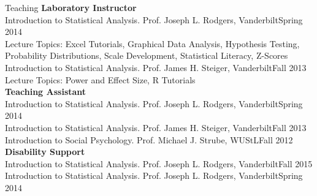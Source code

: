 \documentclass {resume}
\begin{document}
\begin{rSection}{\textrm{Teaching
}}
{\large {\bf Laboratory Instructor}\\}
Introduction to Statistical Analysis. Prof. Joseph L. Rodgers, Vanderbilt\hfill  {Spring 2014}\\
\hspace* {6 mm}Lecture Topics: Excel Tutorials, Graphical Data Analysis, Hypothesis Testing,\\
\hspace* {6 mm}Probability Distributions, Scale Development, Statistical Literacy, Z-Scores%
\smallskip\\
Introduction to Statistical Analysis. Prof. James H. Steiger, Vanderbilt\hfill  {Fall 2013}\\
\hspace* {6 mm}Lecture Topics: Power and Effect Size, R Tutorials\medskip\\
{\large {\bf Teaching Assistant}}\\
Introduction to Statistical Analysis. Prof. Joseph L. Rodgers, Vanderbilt\hfill  {Spring 2014}\smallskip\\
Introduction to Statistical Analysis. Prof. James H. Steiger, Vanderbilt\hfill  {Fall 2013}\smallskip\\
Introduction to Social Psychology. Prof. Michael J. Strube, WUStL\hfill  {Fall 2012}\medskip\\
{\large {\bf Disability Support}}\\
Introduction to Statistical Analysis. Prof. Joseph L. Rodgers, Vanderbilt\hfill  {Fall 2015}\smallskip\\
Introduction to Statistical Analysis. Prof. Joseph L. Rodgers, Vanderbilt\hfill  {Spring 2014}\\
\end{rSection}
\end{document}
